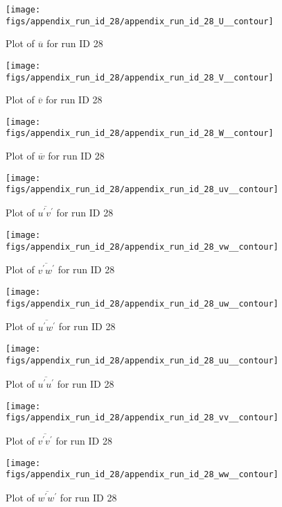 \begin{figure}[H]
\centering
\texttt{[image: figs/appendix\_run\_id\_28/appendix\_run\_id\_28\_U\_\_contour]}
\caption{Plot of $\overline{u}$ for run ID 28}
\label{fig:appendix_run_id_28_U__contour}
\end{figure}


\begin{figure}[H]
\centering
\texttt{[image: figs/appendix\_run\_id\_28/appendix\_run\_id\_28\_V\_\_contour]}
\caption{Plot of $\overline{v}$ for run ID 28}
\label{fig:appendix_run_id_28_V__contour}
\end{figure}


\begin{figure}[H]
\centering
\texttt{[image: figs/appendix\_run\_id\_28/appendix\_run\_id\_28\_W\_\_contour]}
\caption{Plot of $\overline{w}$ for run ID 28}
\label{fig:appendix_run_id_28_W__contour}
\end{figure}


\begin{figure}[H]
\centering
\texttt{[image: figs/appendix\_run\_id\_28/appendix\_run\_id\_28\_uv\_\_contour]}
\caption{Plot of $\overline{u^\prime v^\prime}$ for run ID 28}
\label{fig:appendix_run_id_28_uv__contour}
\end{figure}


\begin{figure}[H]
\centering
\texttt{[image: figs/appendix\_run\_id\_28/appendix\_run\_id\_28\_vw\_\_contour]}
\caption{Plot of $\overline{v^\prime w^\prime}$ for run ID 28}
\label{fig:appendix_run_id_28_vw__contour}
\end{figure}


\begin{figure}[H]
\centering
\texttt{[image: figs/appendix\_run\_id\_28/appendix\_run\_id\_28\_uw\_\_contour]}
\caption{Plot of $\overline{u^\prime w^\prime}$ for run ID 28}
\label{fig:appendix_run_id_28_uw__contour}
\end{figure}


\begin{figure}[H]
\centering
\texttt{[image: figs/appendix\_run\_id\_28/appendix\_run\_id\_28\_uu\_\_contour]}
\caption{Plot of $\overline{u^\prime u^\prime}$ for run ID 28}
\label{fig:appendix_run_id_28_uu__contour}
\end{figure}


\begin{figure}[H]
\centering
\texttt{[image: figs/appendix\_run\_id\_28/appendix\_run\_id\_28\_vv\_\_contour]}
\caption{Plot of $\overline{v^\prime v^\prime}$ for run ID 28}
\label{fig:appendix_run_id_28_vv__contour}
\end{figure}


\begin{figure}[H]
\centering
\texttt{[image: figs/appendix\_run\_id\_28/appendix\_run\_id\_28\_ww\_\_contour]}
\caption{Plot of $\overline{w^\prime w^\prime}$ for run ID 28}
\label{fig:appendix_run_id_28_ww__contour}
\end{figure}



